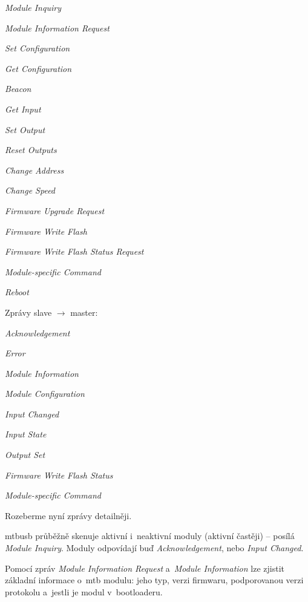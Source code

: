 \begin{compactitem}
\item \textit{Module Inquiry}
\item \textit{Module Information Request}
\item \textit{Set Configuration}
\item \textit{Get Configuration}
\item \textit{Beacon}
\item \textit{Get Input}
\item \textit{Set Output}
\item \textit{Reset Outputs}
\item \textit{Change Address}
\item \textit{Change Speed}
\item \textit{Firmware Upgrade Request}
\item \textit{Firmware Write Flash}
\item \textit{Firmware Write Flash Status Request}
\item \textit{Module-specific Command}
\item \textit{Reboot}

\end{compactitem}

Zprávy slave $\rightarrow$ master:

\begin{compactitem}
\item \textit{Acknowledgement}
\item \textit{Error}
\item \textit{Module Information}
\item \textit{Module Configuration}
\item \textit{Input Changed}
\item \textit{Input State}
\item \textit{Output Set}
\item \textit{Firmware Write Flash Status}
\item \textit{Module-specific Command}
\end{compactitem}

Rozeberme nyní zprávy detailněji.

\gls{mtbusb} průběžně skenuje aktivní i~neaktivní moduly (aktivní častěji)
 – posílá \textit{Module Inquiry}. Moduly odpovídají buď
\textit{Ack\-now\-led\-ge\-ment}, nebo \textit{Input Changed}.

Pomocí zpráv \textit{Module Information Request} a~\textit{Module Information}
lze zjistit základní informace o~\gls{mtb} modulu: jeho typ, verzi firmwaru,
podporovanou verzi protokolu a~jestli je modul v~bootloaderu.

